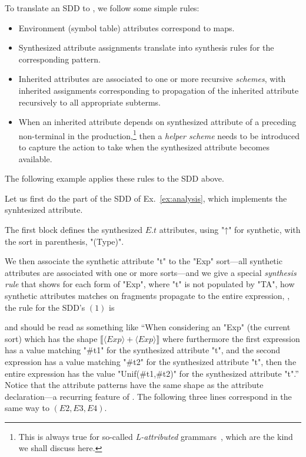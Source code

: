 \documentclass[11pt]{article} %
\begin{document}
To translate an SDD to \HAX, we follow some simple rules:
\begin{itemize}

\item Environment (\aka symbol table) attributes correspond to maps.

\item Synthesized attribute assignments translate into synthesis rules for the corresponding
  pattern.

\item Inherited attributes are associated to one or more recursive \emph{schemes}, with inherited
  assignments corresponding to propagation of the inherited attribute recursively to all appropriate
  subterms.

\item When an inherited attribute depends on synthesized attribute of a preceding non-terminal in
  the production,\footnote{This is always true for so-called \emph{L-attributed}
    grammars~\cite[\S5.1]{Aho+:2006}, which are the kind we shall discuss here.} then a \emph{helper
    scheme} needs to be introduced to capture the action to take when the synthesized attribute
  becomes available.

\end{itemize}
The following example applies these rules to the SDD above.

\begin{example}\label{ex:analysis-hax-syn}
  Let us first do the part of the SDD of Ex.~\ref{ex:analysis}, which implements the synhtesized
  attribute.
  The first block defines the synthesized $E.t$ attributes, using \HAX "↑" for synthetic, with the
  sort in parenthesis, "(Type)".

  We then associate the synthetic attribute "t" to the "Exp" sort---all synthetic attributes are
  associated with one or more sorts---and we give a special \emph{synthesis rule} that shows for
  each form of "Exp", where "t" is not populated by "TA", how synthetic attributes matches on
  fragments propagate to the entire expression, \eg, the rule for the SDD's $(1)$ is
  and should be read as something like ``When considering an "Exp" (the current sort) which has the
  shape $⟦⟨Exp⟩+⟨Exp⟩⟧$ where furthermore the first expression has a value matching "#t1"
  for the synthesized attribute "t", and the second expression has a value matching "#t2" for the
  synthesized attribute "t", then the entire expression has the value "Unif(#t1,#t2)" for the
  synthesized attribute "t".''  Notice that the attribute patterns have the same shape as the
  attribute declaration---a recurring feature of \HAX. The following three lines correspond in the
  same way to $(E2,E3,E4)$.
\end{example}
\end{document}

